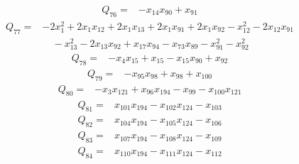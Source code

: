 \begin{equation*}\begin{split}
Q_{76}={}&-x_{14} x_{90} + x_{91}
\end{split}\end{equation*}
\begin{equation*}\begin{split}
Q_{77}={}&-2x_{1}^{2} + 2x_{1} x_{12} + 2x_{1} x_{13} + 2x_{1} x_{91} + 2x_{1} x_{92} - x_{12}^{2} - 2x_{12} x_{91}\\
&\quad -x_{13}^{2} - 2x_{13} x_{92} + x_{17} x_{94} - x_{73} x_{89} - x_{91}^{2} - x_{92}^{2}
\end{split}\end{equation*}
\begin{equation*}\begin{split}
Q_{78}={}&-x_{4} x_{15} + x_{15} - x_{15} x_{90} + x_{92}
\end{split}\end{equation*}
\begin{equation*}\begin{split}
Q_{79}={}&-x_{95} x_{98} + x_{98} + x_{100}
\end{split}\end{equation*}
\begin{equation*}\begin{split}
Q_{80}={}&-x_{3} x_{121} + x_{96} x_{194} - x_{99} - x_{100} x_{121}
\end{split}\end{equation*}
\begin{equation*}\begin{split}
Q_{81}={}&x_{101} x_{194} - x_{102} x_{124} - x_{103}
\end{split}\end{equation*}
\begin{equation*}\begin{split}
Q_{82}={}&x_{104} x_{194} - x_{105} x_{124} - x_{106}
\end{split}\end{equation*}
\begin{equation*}\begin{split}
Q_{83}={}&x_{107} x_{194} - x_{108} x_{124} - x_{109}
\end{split}\end{equation*}
\begin{equation*}\begin{split}
Q_{84}={}&x_{110} x_{194} - x_{111} x_{124} - x_{112}
\end{split}\end{equation*}

